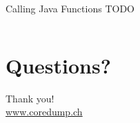 \documentclass[aspectratio=1610,14pt,t]{beamer}
\begin{document}
\begin{frame}[c,fragile]{Calling Java Functions}
  TODO
  \begin{verbatim}
  \end{verbatim}
\end{frame}


\section{Questions?}


{
\begin{frame}[standout]
	\begin{centering}
	{\Huge Thank you!}\\
	{\normalsize \url{www.coredump.ch}}\\
	\end{centering}
\end{frame}
}
\end{document}

